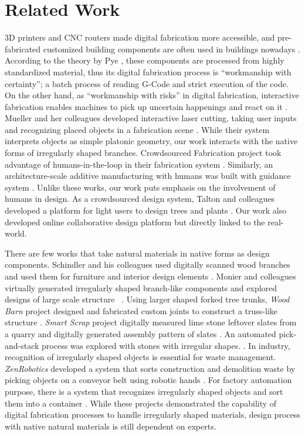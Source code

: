 \section{Related Work}
3D printers and CNC routers made digital fabrication more accessible, and pre-fabricated customized building components are often used in buildings nowadays \cite{knaack2012prefabricated}.
According to the theory by Pye , these components are processed from highly standardized material, thus its digital fabrication process is ``workmanship with certainty''; a batch process of reading G-Code and strict execution of the code.
On the other hand, as ``workmanship with risks'' in digital fabrication, interactive fabrication enables machines to pick up uncertain happenings and react on it \cite{willis2011interactive}.
Mueller and her colleagues developed interactive laser cutting, taking user inputs and recognizing placed objects in a fabrication scene \cite{Mueller:2012:ICI:2380116.2380191}.
While their system interprets objects as simple platonic geometry, our work interacts with the native forms of irregularly shaped branches.
Crowdsourced Fabrication project took advantage of humans-in-the-loop in their fabrication system \cite{lafreniere2016crowdsourced}.
Similarly, an architecture-scale additive manufacturing with humans was built with guidance system \cite{Yoshida:2015:AHA:2809654.2766951}.
Unlike these works, our work puts emphasis on the involvement of humans in design.
As a crowdsourced design system, Talton and colleagues developed a platform for light users to design trees and plants \cite{talton2009exploratory}.
Our work also developed online collaborative design platform but directly linked to the real-world.

There are few works that take natural materials in native forms as design components.
Schindler and his colleagues used digitally scanned wood branches and used them for furniture and interior design elements \cite{schindler2014processing}.
Monier and colleagues virtually generated irregularly shaped branch-like components and explored designs of large scale structure ~\cite{monier2013use}.
Using larger shaped forked tree trunks, \textit{Wood Barn} project designed and fabricated custom joints to construct a truss-like structure \cite{woodbarn}.
\textit{Smart Scrap} project digitally measured lime stone leftover slates from a quarry and digitally generated assembly pattern of slates \cite{smartscrap}.
An automated pick-and-stack process was explored with stones with irregular shapes. \cite{Yoshida:2015:AHA:2809654.2766951}.
In industry, recognition of irregularly shaped objects is essential for waste management.
\textit{ZenRobotics} developed a system that sorts construction and demolition waste by picking objects on a conveyor belt using robotic hands \cite{lukka2014zenrobotics}.
For factory automation purpose, there is a system that recognizes irregularly shaped objects and sort them into a container \cite{sujan2000design}.
While these projects demonstrated the capability of digital fabrication processes to handle irregularly shaped materials, design process with native natural materials is still dependent on experts.

